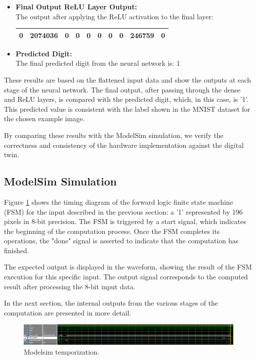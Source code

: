 \documentclass[11pt]{report}
\begin{document}
\begin{itemize}
    \item \textbf{Final Output ReLU Layer Output:} \\
    The output after applying the ReLU activation to the final layer:

    \begin{tabular}{|c|c|c|c|c|c|c|c|c|c|}
    \hline
    0 & 2074036 & 0 & 0 & 0 & 0 & 0 & 0 & 246759 & 0 \\
    \hline
    \end{tabular}

    \item \textbf{Predicted Digit:} \\
    The final predicted digit from the neural network is: 1

\end{itemize}

These results are based on the flattened input data and show the outputs at each stage of the neural network. The final output, after passing through the dense and ReLU layers, is compared with the predicted digit, which, in this case, is '1'. This predicted value is consistent with the label shown in the MNIST dataset for the chosen example image.

By comparing these results with the ModelSim simulation, we verify the correctness and consistency of the hardware implementation against the digital twin.

\subsection{ModelSim Simulation}

Figure \ref{fig:modelsim_temporization} shows the timing diagram of the forward logic finite state machine (FSM) for the input described in the previous section: a '1' represented by 196 pixels in 8-bit precision. The FSM is triggered by a start signal, which indicates the beginning of the computation process. Once the FSM completes its operations, the "done" signal is asserted to indicate that the computation has finished.

The expected output is displayed in the waveform, showing the result of the FSM execution for this specific input. The output signal corresponds to the computed result after processing the 8-bit input data.

In the next section, the internal outputs from the various stages of the computation are presented in more detail.

\begin{figure}[!h]
    \centering
    \includegraphics[width=1\linewidth]{images/neural_network/modelsim_NN_waveform.png}
    \caption{Modelsim temporization.}
    \label{fig:modelsim_temporization}
\end{figure}
\end{document}
